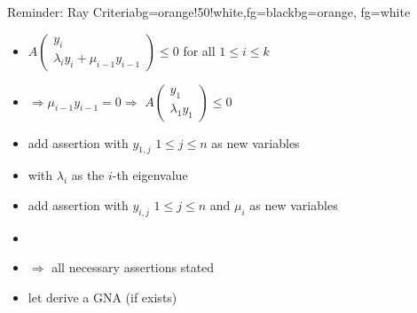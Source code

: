 \begin{frame}
	\begin{variableblock}{Reminder: Ray Criteria}{bg=orange!50!white,fg=black}{bg=orange, fg=white}
		\begin{itemize}
			\setlength{\itemindent}{1cm}
			\item[(ray)] $A\begin{pmatrix} y_i \\ \lambda_i y_i + \mu_{i-1} y_{i-1} \end{pmatrix} \le 0$ for all $1 \le i \le k$
		\end{itemize}
	\end{variableblock}
	\begin{itemize}
		\setlength{\itemindent}{1cm}
		\item[$i=1$:] $\Rightarrow \mu_{i-1}y_{i-1}=0 \Rightarrow $ $A\begin{pmatrix} y_1 \\ \lambda_1 y_1 \end{pmatrix} \le 0$
		\item[]	add assertion with $y_{1,j}$ $1\le j \le n$ as new variables
		\item[$i>1$:] with $\lambda_i$ as the $i$-th eigenvalue 
		\item[] add assertion with $y_{i,j}$ $1 \le j \le n$ and $\mu_i$ as new variables
		\item[]
		\item[] $\Rightarrow$ all necessary assertions stated \checkmark
		\item[] let \solver derive a GNA (if exists)
	\end{itemize}	
\end{frame}


